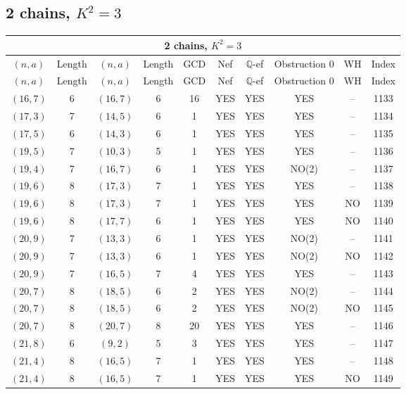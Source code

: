 \subsection{2 chains, $K^2 = 3$}
\begin{longtable}{|c|c|c|c|c|c|c|c|c|c|}
\hline
\multicolumn{10}{|c|}{2 chains, $K^2 = 3$}\\
\hline
$(n,a)$ & Length & $(n,a)$ & Length & GCD & Nef & $\mathbb Q$-ef & Obstruction 0 & WH & Index\\
\hline
\endfirsthead

\hline
$(n,a)$ & Length & $(n,a)$ & Length & GCD & Nef & $\mathbb Q$-ef & Obstruction 0 & WH & Index\\
\hline
\endhead
\hline
\endfoot

$(16, 7)$ & 6 & $(16, 7)$ & 6 & 16 & YES & YES & YES & -- & 1133\\
$(17, 3)$ & 7 & $(14, 5)$ & 6 & 1 & YES & YES & YES & -- & 1134\\
$(17, 5)$ & 6 & $(14, 3)$ & 6 & 1 & YES & YES & YES & -- & 1135\\
$(19, 5)$ & 7 & $(10, 3)$ & 5 & 1 & YES & YES & YES & -- & 1136\\
$(19, 4)$ & 7 & $(16, 7)$ & 6 & 1 & YES & YES & NO(2) & -- & 1137\\
$(19, 6)$ & 8 & $(17, 3)$ & 7 & 1 & YES & YES & YES & -- & 1138\\
$(19, 6)$ & 8 & $(17, 3)$ & 7 & 1 & YES & YES & YES & NO & 1139\\
$(19, 6)$ & 8 & $(17, 7)$ & 6 & 1 & YES & YES & YES & NO & 1140\\
$(20, 9)$ & 7 & $(13, 3)$ & 6 & 1 & YES & YES & NO(2) & -- & 1141\\
$(20, 9)$ & 7 & $(13, 3)$ & 6 & 1 & YES & YES & NO(2) & NO & 1142\\
$(20, 9)$ & 7 & $(16, 5)$ & 7 & 4 & YES & YES & YES & -- & 1143\\
$(20, 7)$ & 8 & $(18, 5)$ & 6 & 2 & YES & YES & NO(2) & -- & 1144\\
$(20, 7)$ & 8 & $(18, 5)$ & 6 & 2 & YES & YES & NO(2) & NO & 1145\\
$(20, 7)$ & 8 & $(20, 7)$ & 8 & 20 & YES & YES & YES & -- & 1146\\
$(21, 8)$ & 6 & $(9, 2)$ & 5 & 3 & YES & YES & YES & -- & 1147\\
$(21, 4)$ & 8 & $(16, 5)$ & 7 & 1 & YES & YES & YES & -- & 1148\\
$(21, 4)$ & 8 & $(16, 5)$ & 7 & 1 & YES & YES & YES & NO & 1149\\

\end{longtable}
